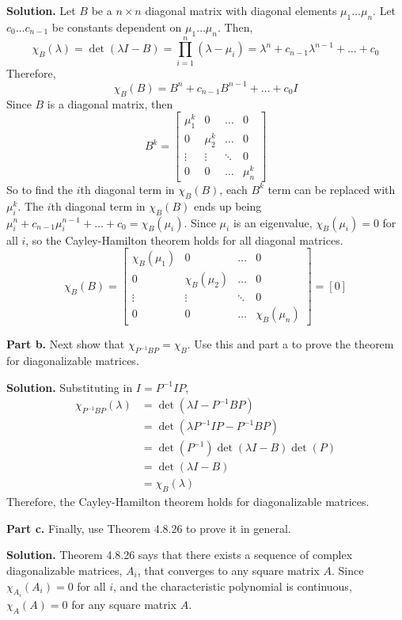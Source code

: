\documentclass[12pt]{article}
\newcommand{\inv}{^{-1}}
\begin{document}
\textbf{Solution.}
Let $B$ be a $n\times n$ diagonal matrix 
with diagonal elements $\mu_1 \hdots \mu_n$.
Let $c_0 \hdots c_{n-1}$ be constants dependent on $\mu_1 \hdots \mu_n$.
Then,
\[
    \chi_B(\lambda) 
    = \det(\lambda I-B) 
    = \prod_{i=1}^n (\lambda - \mu_i)
    = \lambda^n + c_{n-1}\lambda^{n-1} + \hdots + c_0
\]
Therefore, 
\[
    \chi_B(B) = B^n + c_{n-1}B^{n-1} + \hdots + c_0I
\]
Since $B$ is a diagonal matrix, then
\[
    B^k = 
    \begin{bmatrix}
        \mu_1^k & 0 & \hdots  & 0 \\
        0 & \mu_2^k &\hdots & 0 \\
        \vdots & \vdots  & \ddots & 0 \\
        0 & 0 & \hdots & \mu_n^k
    \end{bmatrix}
\]
So to find the $i$th diagonal term in $\chi_B(B)$,
each $B^k$ term can be replaced with $\mu_i^k$.
The $i$th diagonal term in $\chi_B(B)$ ends up being
$\mu_i^n + c_{n-1}\mu_i^{n-1} + \hdots + c_0 = \chi_B(\mu_i)$.
Since $\mu_i$ is an eigenvalue, $\chi_B(\mu_i) = 0$ for all $i$,
so the Cayley-Hamilton theorem holds for all diagonal matrices.
\[
    \chi_B(B) = 
    \begin{bmatrix}
        \chi_B(\mu_1) & 0 & \hdots  & 0 \\
        0 & \chi_B(\mu_2) &\hdots & 0 \\
        \vdots & \vdots  & \ddots & 0 \\
        0 & 0 & \hdots & \chi_B(\mu_n)
    \end{bmatrix} = 
    [0]
\]
\bigskip

\noindent \textbf{Part b.}
Next show that $\chi_{P^{-1}BP} = \chi_B$. Use this and part a to prove the theorem for diagonalizable matrices.

\medskip

\textbf{Solution.}
Substituting in $I = P\inv I P$,
\begin{align*}
    \chi_{P\inv BP}(\lambda)
    &= \det(\lambda I - P\inv BP) \\
    &= \det(\lambda P\inv IP - P\inv BP) \\ 
    &= \det(P\inv) \det(\lambda I - B) \det(P) \\
    &= \det(\lambda I - B) \\
    &= \chi_{B}(\lambda)
\end{align*}
Therefore, the Cayley-Hamilton theorem holds for diagonalizable matrices.
\bigskip

\noindent \textbf{Part c.}
Finally, use Theorem 4.8.26 to prove it in general.
\medskip


\textbf{Solution.}
Theorem 4.8.26 says that there exists 
a sequence of complex diagonalizable matrices, $A_i$,
that converges to any square matrix $A$.
Since $\chi_{A_i}(A_i) = 0$ for all $i$,
and the characteristic polynomial is continuous,
$\chi_A(A) = 0$ for any square matrix $A$. 
\end{document}
